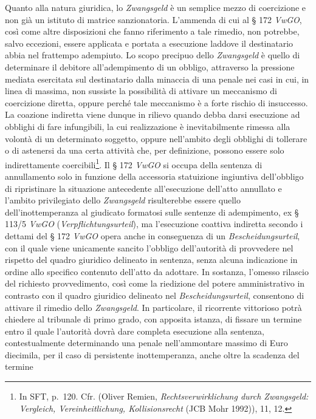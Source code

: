 \documentclass[12pt,it,a4paper,]{report}
\begin{document}
Quanto alla natura giuridica, lo \emph{Zwangsgeld} è un semplice mezzo
di coercizione e non già un istituto di matrice sanzionatoria. L'ammenda
di cui al § 172 \emph{VwGO}, così come altre disposizioni che fanno
riferimento a tale rimedio, non potrebbe, salvo eccezioni, essere
applicata e portata a esecuzione laddove il destinatario abbia nel
frattempo adempiuto. Lo scopo precipuo dello \emph{Zwangsgeld} è quello
di determinare il debitore all'adempimento di un obbligo, attraverso la
pressione mediata esercitata sul destinatario dalla minaccia di una
penale nei casi in cui, in linea di massima, non sussiste la possibilità
di attivare un meccanismo di coercizione diretta, oppure perché tale
meccanismo è a forte rischio di insuccesso. La coazione indiretta viene
dunque in rilievo quando debba darsi esecuzione ad obblighi di fare
infungibili, la cui realizzazione è inevitabilmente rimessa alla volontà
di un determinato soggetto, oppure nell'ambito degli obblighi di
tollerare o di astenersi da una certa attività che, per definizione,
possono essere solo indirettamente coercibili\footnote{In SFT, p.~120.
  Cfr. (Oliver Remien, \emph{Rechtsverwirklichung durch Zwangsgeld:
  Vergleich, Vereinheitlichung, Kollisionsrecht} (JCB Mohr 1992)), 11,
  12.}. Il § 172 \emph{VwGO} si occupa della sentenza di annullamento
solo in funzione della accessoria statuizione ingiuntiva dell'obbligo di
ripristinare la situazione antecedente all'esecuzione dell'atto
annullato e l'ambito privilegiato dello \emph{Zwangsgeld} risulterebbe
essere quello dell'inottemperanza al giudicato formatosi sulle sentenze
di adempimento, ex § 113/5 \emph{VwGO} (\emph{Verpflichtungsurteil}), ma
l'esecuzione coattiva indiretta secondo i dettami del § 172 \emph{VwGO}
opera anche in conseguenza di un \emph{Bescheidungsurteil}, con il quale
viene unicamente sancito l'obbligo dell'autorità di provvedere nel
rispetto del quadro giuridico delineato in sentenza, senza alcuna
indicazione in ordine allo specifico contenuto dell'atto da adottare. In
sostanza, l'omesso rilascio del richiesto provvedimento, così come la
riedizione del potere amministrativo in contrasto con il quadro
giuridico delineato nel \emph{Bescheidungsurteil}, consentono di
attivare il rimedio dello \emph{Zwangsgeld}. In particolare, il
ricorrente vittorioso potrà chiedere al tribunale di primo grado, con
apposita istanza, di fissare un termine entro il quale l'autorità dovrà
dare completa esecuzione alla sentenza, contestualmente determinando una
penale nell'ammontare massimo di Euro diecimila, per il caso di
persistente inottemperanza, anche oltre la scadenza del termine
\end{document}

